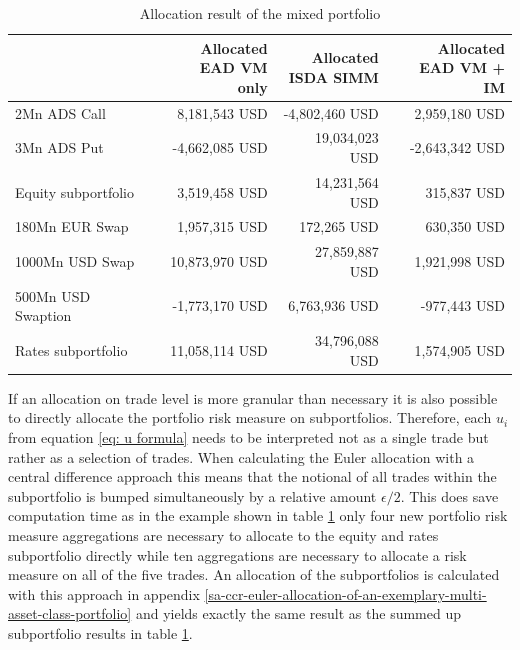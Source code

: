 \documentclass[../Thesis_AHoecherl.tex]{subfiles}
\begin{document}
    \begin{table}[htbp]
        \centering
        \begin{tabular}{l||r|r|r}
                & \makecell{Allocated \\ \gls{EAD} \gls{VM} only} &\makecell{Allocated \\ \gls{ISDA SIMM}} & \makecell{Allocated \\\gls{EAD} \gls{VM} + \gls{IM}} \\
                \toprule
        2Mn ADS Call & 8,181,543 USD & -4,802,460 USD & 2,959,180 USD \\
        3Mn ADS Put & -4,662,085 USD & 19,034,023 USD & -2,643,342 USD \\
        \midrule
        Equity subportfolio & 3,519,458 USD & 14,231,564 USD & 315,837 USD \\
        \toprule
        180Mn EUR Swap & 1,957,315 USD & 172,265 USD & 630,350 USD \\
        1000Mn USD Swap & 10,873,970 USD & 27,859,887 USD & 1,921,998 USD \\
        500Mn USD Swaption & -1,773,170 USD & 6,763,936 USD & -977,443 USD \\
        \midrule
        Rates subportfolio & 11,058,114 USD & 34,796,088 USD & 1,574,905 USD \\
        \end{tabular}%
        \caption{Allocation result of the mixed portfolio}
        \label{tab:multiAssetAllocation}%
    \end{table}%

    If an allocation on trade level is more granular than necessary it is also possible to directly allocate the portfolio risk measure on subportfolios. Therefore, each $u_i$ from equation \ref{eq: u formula} needs to be interpreted not as a single trade but rather as a selection of trades.
    When calculating the Euler allocation with a central difference approach this means that the notional of all trades within the subportfolio is bumped simultaneously by a relative amount $\epsilon / 2$.
    This does save computation time as in the example shown in table \ref{tab:multiAssetAllocation} only four new portfolio risk measure aggregations are necessary to allocate to the equity and rates subportfolio directly while ten aggregations are necessary to allocate a risk measure on all of the five trades. An allocation of the subportfolios is calculated with this approach in appendix \ref{sa-ccr-euler-allocation-of-an-exemplary-multi-asset-class-portfolio} and yields exactly the same result as the summed up subportfolio results in table \ref{tab:multiAssetAllocation}.
\end{document}
